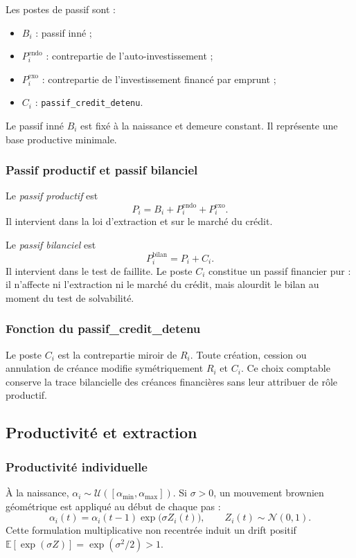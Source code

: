 \documentclass[10pt,a4paper]{article}
\begin{document}
Les postes de passif sont :
\begin{itemize}
\item \(B_i\) : passif inné ;
\item \(P_i^{\mathrm{endo}}\) : contrepartie de l'auto-investissement ;
\item \(P_i^{\mathrm{exo}}\) : contrepartie de l'investissement financé par emprunt ;
\item \(C_i\) : \texttt{passif\_credit\_detenu}.
\end{itemize}

Le passif inné \(B_i\) est fixé à la naissance et demeure constant. Il représente une base productive minimale.

\subsubsection{Passif productif et passif bilanciel}

Le \emph{passif productif} est
\[
P_i = B_i + P_i^{\mathrm{endo}} + P_i^{\mathrm{exo}}.
\]
Il intervient dans la loi d'extraction et sur le marché du crédit.

Le \emph{passif bilanciel} est
\[
P_i^{\mathrm{bilan}} = P_i + C_i.
\]
Il intervient dans le test de faillite. Le poste \(C_i\) constitue un passif financier pur : il n'affecte ni l'extraction ni le marché du crédit, mais alourdit le bilan au moment du test de solvabilité.

\subsubsection{Fonction du passif\_credit\_detenu}

Le poste \(C_i\) est la contrepartie miroir de \(R_i\). Toute création, cession ou annulation de créance modifie symétriquement \(R_i\) et \(C_i\). Ce choix comptable conserve la trace bilancielle des créances financières sans leur attribuer de rôle productif.

\subsection{Productivité et extraction}

\subsubsection{Productivité individuelle}

À la naissance, \(\alpha_i\sim\mathcal U([\alpha_{\min},\alpha_{\max}])\). Si \(\sigma>0\), un mouvement brownien géométrique est appliqué au début de chaque pas :
\[
\alpha_i(t) = \alpha_i(t-1)\exp\!\bigl(\sigma Z_i(t)\bigr),\qquad Z_i(t)\sim\mathcal N(0,1).
\]
Cette formulation multiplicative non recentrée induit un drift positif \(\mathbb E[\exp(\sigma Z)]=\exp(\sigma^2/2)>1\).
\end{document}
